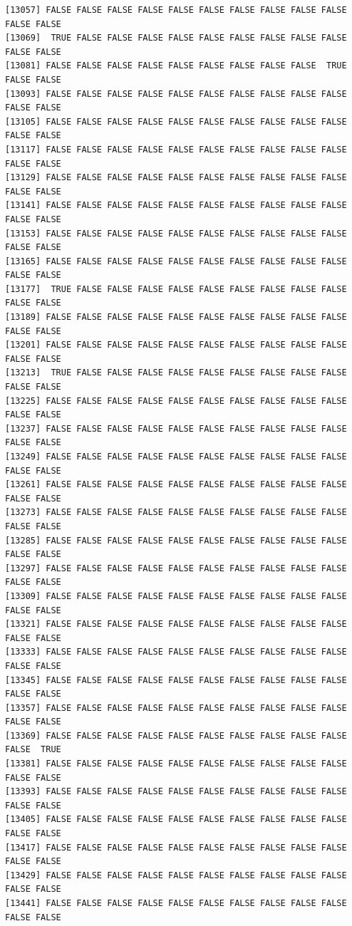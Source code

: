 \documentclass[
  a4paper,
  DIV=11,
  numbers=noendperiod]{scrartcl}
\begin{document}
\begin{verbatim}
[13057] FALSE FALSE FALSE FALSE FALSE FALSE FALSE FALSE FALSE FALSE FALSE FALSE
[13069]  TRUE FALSE FALSE FALSE FALSE FALSE FALSE FALSE FALSE FALSE FALSE FALSE
[13081] FALSE FALSE FALSE FALSE FALSE FALSE FALSE FALSE FALSE  TRUE FALSE FALSE
[13093] FALSE FALSE FALSE FALSE FALSE FALSE FALSE FALSE FALSE FALSE FALSE FALSE
[13105] FALSE FALSE FALSE FALSE FALSE FALSE FALSE FALSE FALSE FALSE FALSE FALSE
[13117] FALSE FALSE FALSE FALSE FALSE FALSE FALSE FALSE FALSE FALSE FALSE FALSE
[13129] FALSE FALSE FALSE FALSE FALSE FALSE FALSE FALSE FALSE FALSE FALSE FALSE
[13141] FALSE FALSE FALSE FALSE FALSE FALSE FALSE FALSE FALSE FALSE FALSE FALSE
[13153] FALSE FALSE FALSE FALSE FALSE FALSE FALSE FALSE FALSE FALSE FALSE FALSE
[13165] FALSE FALSE FALSE FALSE FALSE FALSE FALSE FALSE FALSE FALSE FALSE FALSE
[13177]  TRUE FALSE FALSE FALSE FALSE FALSE FALSE FALSE FALSE FALSE FALSE FALSE
[13189] FALSE FALSE FALSE FALSE FALSE FALSE FALSE FALSE FALSE FALSE FALSE FALSE
[13201] FALSE FALSE FALSE FALSE FALSE FALSE FALSE FALSE FALSE FALSE FALSE FALSE
[13213]  TRUE FALSE FALSE FALSE FALSE FALSE FALSE FALSE FALSE FALSE FALSE FALSE
[13225] FALSE FALSE FALSE FALSE FALSE FALSE FALSE FALSE FALSE FALSE FALSE FALSE
[13237] FALSE FALSE FALSE FALSE FALSE FALSE FALSE FALSE FALSE FALSE FALSE FALSE
[13249] FALSE FALSE FALSE FALSE FALSE FALSE FALSE FALSE FALSE FALSE FALSE FALSE
[13261] FALSE FALSE FALSE FALSE FALSE FALSE FALSE FALSE FALSE FALSE FALSE FALSE
[13273] FALSE FALSE FALSE FALSE FALSE FALSE FALSE FALSE FALSE FALSE FALSE FALSE
[13285] FALSE FALSE FALSE FALSE FALSE FALSE FALSE FALSE FALSE FALSE FALSE FALSE
[13297] FALSE FALSE FALSE FALSE FALSE FALSE FALSE FALSE FALSE FALSE FALSE FALSE
[13309] FALSE FALSE FALSE FALSE FALSE FALSE FALSE FALSE FALSE FALSE FALSE FALSE
[13321] FALSE FALSE FALSE FALSE FALSE FALSE FALSE FALSE FALSE FALSE FALSE FALSE
[13333] FALSE FALSE FALSE FALSE FALSE FALSE FALSE FALSE FALSE FALSE FALSE FALSE
[13345] FALSE FALSE FALSE FALSE FALSE FALSE FALSE FALSE FALSE FALSE FALSE FALSE
[13357] FALSE FALSE FALSE FALSE FALSE FALSE FALSE FALSE FALSE FALSE FALSE FALSE
[13369] FALSE FALSE FALSE FALSE FALSE FALSE FALSE FALSE FALSE FALSE FALSE  TRUE
[13381] FALSE FALSE FALSE FALSE FALSE FALSE FALSE FALSE FALSE FALSE FALSE FALSE
[13393] FALSE FALSE FALSE FALSE FALSE FALSE FALSE FALSE FALSE FALSE FALSE FALSE
[13405] FALSE FALSE FALSE FALSE FALSE FALSE FALSE FALSE FALSE FALSE FALSE FALSE
[13417] FALSE FALSE FALSE FALSE FALSE FALSE FALSE FALSE FALSE FALSE FALSE FALSE
[13429] FALSE FALSE FALSE FALSE FALSE FALSE FALSE FALSE FALSE FALSE FALSE FALSE
[13441] FALSE FALSE FALSE FALSE FALSE FALSE FALSE FALSE FALSE FALSE FALSE FALSE

\end{verbatim}
\end{document}
